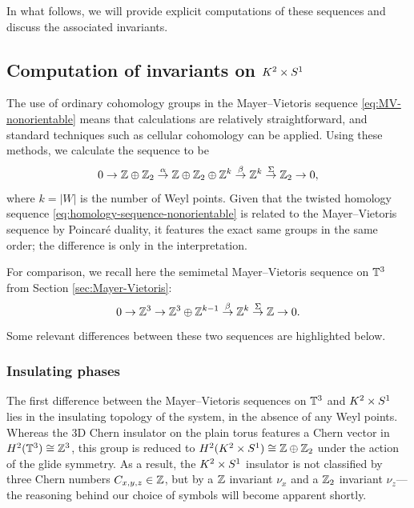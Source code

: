In what follows, we will provide explicit computations of these sequences and discuss the associated invariants.


\subsection{Computation of invariants on \texorpdfstring{$K^2\times S^1$}{K²×S¹}}\label{sec:invariants}

The use of ordinary cohomology groups in the Mayer--Vietoris sequence \eqref{eq:MV-nonorientable} means that calculations are relatively straightforward, and standard techniques such as cellular cohomology can be applied.  %
Using these methods, we calculate the sequence to be
\begin{equation}\label{eq:explicit-sequence-nonorientable}
	0\to \mathbb{Z}\oplus\mathbb{Z}_2 \overset{\alpha}{\to} \mathbb{Z}\oplus\mathbb{Z}_2\oplus\mathbb{Z}^k \overset{\beta}{\to} \mathbb{Z}^k \overset{\Sigma}{\to} \mathbb{Z}_2 \to 0,
\end{equation}
where $k = |W|$ is the number of Weyl points. Given that the twisted homology sequence \eqref{eq:homology-sequence-nonorientable} is related to the Mayer--Vietoris sequence by Poincaré duality, it features the exact same groups in the same order; the difference is only in the interpretation. 

For comparison, we recall here the semimetal Mayer--Vietoris sequence on $\mathbb{T}^3$ from Section \ref{sec:Mayer-Vietoris}:
\begin{equation}\label{eq:semimetal-MV-explicit-again}
	0 \to \mathbb{Z}^3 \to \mathbb{Z}^3\oplus\mathbb{Z}^{k-1} \overset{\beta}{\to} \mathbb{Z}^k \overset{\Sigma}{\to} \mathbb{Z} \to 0.
\end{equation}
Some relevant differences between these two sequences are highlighted below.

\subsubsection{Insulating phases}

The first difference between the Mayer--Vietoris sequences on $\mathbb{T}^3$ and $K^2\times S^1$ lies in the insulating topology of the system, in the absence of any Weyl points. Whereas the 3D Chern insulator on the plain torus features a Chern vector in $H^2(\mathbb{T}^3)\cong\mathbb{Z}^3$, this group is reduced to $H^2(K^2\times S^1)\cong\mathbb{Z}\oplus\mathbb{Z}_2$ under the action of the glide symmetry. As a result, the $K^2\times S^1$ insulator is not classified by three Chern numbers $C_{x,y,z}\in\mathbb{Z}$, but by a $\mathbb{Z}$ invariant $\nu_x$ and a $\mathbb{Z}_2$ invariant $\nu_z$---the reasoning behind our choice of symbols will become apparent shortly.

